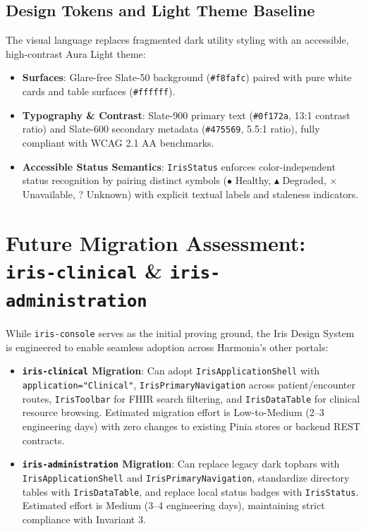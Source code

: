 \subsection{Design Tokens and Light Theme Baseline}
The visual language replaces fragmented dark utility styling with an accessible, high-contrast Aura Light theme:
\begin{itemize}
    \item \textbf{Surfaces}: Glare-free Slate-50 background (\texttt{\#f8fafc}) paired with pure white cards and table surfaces (\texttt{\#ffffff}).
    \item \textbf{Typography \& Contrast}: Slate-900 primary text (\texttt{\#0f172a}, 13:1 contrast ratio) and Slate-600 secondary metadata (\texttt{\#475569}, 5.5:1 ratio), fully compliant with WCAG 2.1 AA benchmarks.
    \item \textbf{Accessible Status Semantics}: \texttt{IrisStatus} enforces color-independent status recognition by pairing distinct symbols ($\bullet$ Healthy, $\blacktriangle$ Degraded, $\times$ Unavailable, ? Unknown) with explicit textual labels and staleness indicators.
\end{itemize}

\section{Future Migration Assessment: \texttt{iris-clinical} \& \texttt{iris-administration}}
\label{sec:iris_migration_assessment}

While \texttt{iris-console} serves as the initial proving ground, the Iris Design System is engineered to enable seamless adoption across Harmonia's other portals:
\begin{itemize}
    \item \textbf{\texttt{iris-clinical} Migration}: Can adopt \texttt{IrisApplicationShell} with \texttt{application="Clinical"}, \texttt{IrisPrimaryNavigation} across patient/encounter routes, \texttt{IrisToolbar} for FHIR search filtering, and \texttt{IrisDataTable} for clinical resource browsing. Estimated migration effort is Low-to-Medium (2--3 engineering days) with zero changes to existing Pinia stores or backend REST contracts.
    \item \textbf{\texttt{iris-administration} Migration}: Can replace legacy dark topbars with \texttt{IrisApplicationShell} and \texttt{IrisPrimaryNavigation}, standardize directory tables with \texttt{IrisDataTable}, and replace local status badges with \texttt{IrisStatus}. Estimated effort is Medium (3--4 engineering days), maintaining strict compliance with Invariant 3.
\end{itemize}

\newpage
